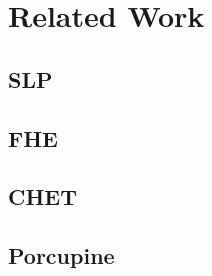 \section{Related Work}\label{sec:related-work}
\subsection{SLP}
\subsection{FHE}
\subsection{CHET}
\subsection{Porcupine}
